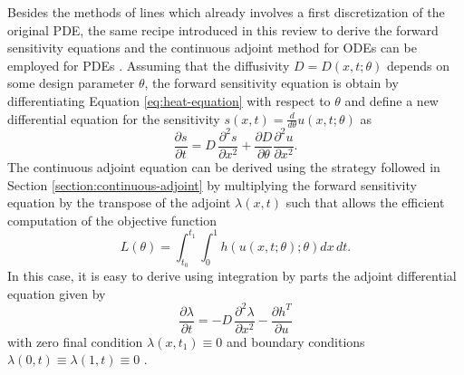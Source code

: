 Besides the methods of lines which already involves a first discretization of the original PDE, the same recipe introduced in this review to derive the forward sensitivity equations and the continuous adjoint method for ODEs can be employed for PDEs \cite{Giles_Pierce_2000}. 
Assuming that the diffusivity $D = D(x, t; \theta)$ depends on some design parameter $\theta$, the forward sensitivity equation is obtain by differentiating Equation \eqref{eq:heat-equation} with respect to $\theta$ and define a new differential equation for the sensitivity $s(x,t) = \frac{d}{d\theta}u(x,t;\theta)$ as 
\begin{equation}
 \frac{\partial s}{\partial t}
 = 
 D \, 
 \frac{\partial^2 s}{\partial x^2}
 + 
 \frac{\partial D}{\partial \theta} \frac{\partial^2 u}{\partial x^2}. 
\end{equation}
The continuous adjoint equation can be derived using the strategy followed in Section \ref{section:continuous-adjoint} by multiplying the forward sensitivity equation by the transpose of the adjoint $\lambda (x,t)$ such that allows the efficient computation of the objective function
\begin{equation}
    L(\theta) = \int_{t_0}^{t_1} \int_0^1 h(u(x,t;\theta); \theta) dx \, dt. 
\end{equation}
In this case, it is easy to derive using integration by parts the adjoint differential equation given by 
\begin{equation}
    \frac{\partial \lambda}{\partial t}
    = 
    - 
    D \, \frac{\partial^2 \lambda}{\partial x^2}
    - 
    \frac{\partial h^T}{\partial u}
\end{equation}
with zero final condition $\lambda(x, t_1) \equiv 0$ and boundary conditions $\lambda(0, t) \equiv \lambda(1, t) \equiv 0$ \cite{duchateau1996introduction}.

